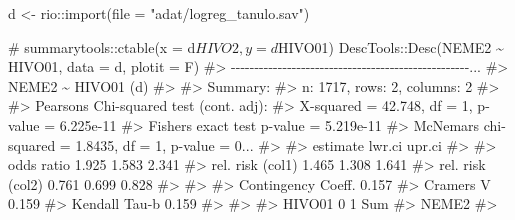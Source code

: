 \documentclass[
  letterpaper,
]{krantz}
\makeatletter
\newenvironment{Shaded}{\begin{snugshade}}{\end{snugshade}}
\newcommand{\AttributeTok}[1]{\textcolor[rgb]{0.40,0.45,0.13}{#1}}
\newcommand{\CommentTok}[1]{\textcolor[rgb]{0.37,0.37,0.37}{#1}}
\newcommand{\FunctionTok}[1]{\textcolor[rgb]{0.28,0.35,0.67}{#1}}
\newcommand{\NormalTok}[1]{\textcolor[rgb]{0.00,0.23,0.31}{#1}}
\newcommand{\OtherTok}[1]{\textcolor[rgb]{0.00,0.23,0.31}{#1}}
\newcommand{\SpecialCharTok}[1]{\textcolor[rgb]{0.37,0.37,0.37}{#1}}
\newcommand{\StringTok}[1]{\textcolor[rgb]{0.13,0.47,0.30}{#1}}
\newenvironment{kframe}{%
\medskip{}
\setlength{\fboxsep}{.8em}
 \def\at@end@of@kframe{}%
 \ifinner\ifhmode%
  \def\at@end@of@kframe{\end{minipage}}%
  \begin{minipage}{\columnwidth}%
 \fi\fi%
 \def\FrameCommand##1{\hskip\@totalleftmargin \hskip-\fboxsep
 \colorbox{shadecolor}{##1}\hskip-\fboxsep
     \hskip-\linewidth \hskip-\@totalleftmargin \hskip\columnwidth}%
 \MakeFramed {\advance\hsize-\width
   \@totalleftmargin\z@ \linewidth\hsize
   \@setminipage}}%
 {\par\unskip\endMakeFramed%
 \at@end@of@kframe}
\renewenvironment{Shaded}{\begin{kframe}}{\end{kframe}}
\makeatother
\begin{document}
\begin{Shaded}
\begin{Highlighting}[]
\NormalTok{d }\OtherTok{\textless{}{-}}\NormalTok{ rio}\SpecialCharTok{::}\FunctionTok{import}\NormalTok{(}\AttributeTok{file =} \StringTok{"adat/logreg\_tanulo.sav"}\NormalTok{)}
\end{Highlighting}
\end{Shaded}

\begin{Shaded}
\begin{Highlighting}[]
\CommentTok{\# summarytools::ctable(x = d$HIVO2, y = d$HIVO01)}
\NormalTok{DescTools}\SpecialCharTok{::}\FunctionTok{Desc}\NormalTok{(NEME2 }\SpecialCharTok{\textasciitilde{}}\NormalTok{ HIVO01, }\AttributeTok{data =}\NormalTok{ d, }\AttributeTok{plotit =}\NormalTok{ F)}
\CommentTok{\#\textgreater{} {-}{-}{-}{-}{-}{-}{-}{-}{-}{-}{-}{-}{-}{-}{-}{-}{-}{-}{-}{-}{-}{-}{-}{-}{-}{-}{-}{-}{-}{-}{-}{-}{-}{-}{-}{-}{-}{-}{-}{-}{-}{-}{-}{-}{-}{-}{-}{-}{-}{-}{-}...}
\CommentTok{\#\textgreater{} NEME2 \textasciitilde{} HIVO01 (d)}
\CommentTok{\#\textgreater{} }
\CommentTok{\#\textgreater{} Summary: }
\CommentTok{\#\textgreater{} n: 1\textquotesingle{}717, rows: 2, columns: 2}
\CommentTok{\#\textgreater{} }
\CommentTok{\#\textgreater{} Pearson\textquotesingle{}s Chi{-}squared test (cont. adj):}
\CommentTok{\#\textgreater{}   X{-}squared = 42.748, df = 1, p{-}value = 6.225e{-}11}
\CommentTok{\#\textgreater{} Fisher\textquotesingle{}s exact test p{-}value = 5.219e{-}11}
\CommentTok{\#\textgreater{} McNemar\textquotesingle{}s chi{-}squared = 1.8435, df = 1, p{-}value = 0...}
\CommentTok{\#\textgreater{} }
\CommentTok{\#\textgreater{}                     estimate lwr.ci upr.ci\textquotesingle{}}
\CommentTok{\#\textgreater{}                                           }
\CommentTok{\#\textgreater{} odds ratio             1.925  1.583  2.341}
\CommentTok{\#\textgreater{} rel. risk (col1)       1.465  1.308  1.641}
\CommentTok{\#\textgreater{} rel. risk (col2)       0.761  0.699  0.828}
\CommentTok{\#\textgreater{} }
\CommentTok{\#\textgreater{} }
\CommentTok{\#\textgreater{} Contingency Coeff.     0.157}
\CommentTok{\#\textgreater{} Cramer\textquotesingle{}s V             0.159}
\CommentTok{\#\textgreater{} Kendall Tau{-}b          0.159}
\CommentTok{\#\textgreater{} }
\CommentTok{\#\textgreater{}                                    }
\CommentTok{\#\textgreater{}         HIVO01      0      1    Sum}
\CommentTok{\#\textgreater{} NEME2                              }
\CommentTok{\#\textgreater{}                                    }

\end{Highlighting}
\end{Shaded}
\end{document}
